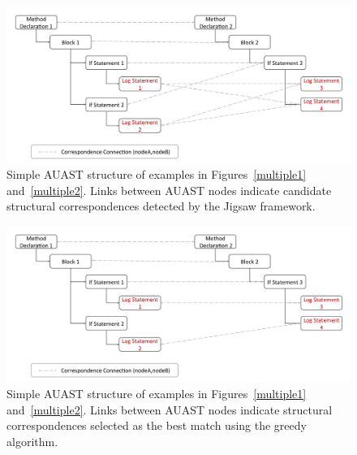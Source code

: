 \begin{figure} [H]
  \centering\includegraphics [width = \textwidth]{Drawing4/multipleLogging.pdf}
  \caption{Simple AUAST structure of examples in Figures~\ref{multiple1} and~\ref{multiple2}. Links between AUAST nodes indicate candidate structural correspondences detected by the Jigsaw framework.}
  \label{mast_1}
\end{figure}


\begin{figure} [H]
  \centering\includegraphics [width = \textwidth]{Drawing4/multipleLogging2.pdf}
  \caption{Simple AUAST structure of examples in Figures~\ref{multiple1} and~\ref{multiple2}. Links between AUAST nodes indicate structural correspondences selected as the best match using the greedy algorithm.}
  \label{m_ast2}
\end{figure}

